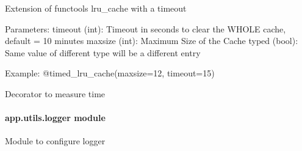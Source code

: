 \documentclass[letterpaper,10pt,english]{sphinxmanual}
\begin{document}
\begin{fulllineitems}
\label{\detokenize{app.utils:app.utils.decorators.timed_lru_cache}}
\pysigstartsignatures
{}
\pysigstopsignatures
\sphinxAtStartPar
Extension of functools lru\_cache with a timeout

\sphinxAtStartPar
Parameters:
timeout (int): Timeout in seconds to clear the WHOLE cache, default = 10 minutes
maxsize (int): Maximum Size of the Cache
typed (bool): Same value of different type will be a different entry

\sphinxAtStartPar
Example:
@timed\_lru\_cache(maxsize=12, timeout=15)

\end{fulllineitems}


\begin{fulllineitems}
\label{\detokenize{app.utils:app.utils.decorators.timeit}}
\pysigstartsignatures
{}
\pysigstopsignatures
\sphinxAtStartPar
Decorator to measure time

\end{fulllineitems}



\paragraph{app.utils.logger module}
\label{\detokenize{app.utils:module-app.utils.logger}}\label{\detokenize{app.utils:app-utils-logger-module}}
\sphinxAtStartPar
Module to configure logger
\end{document}

